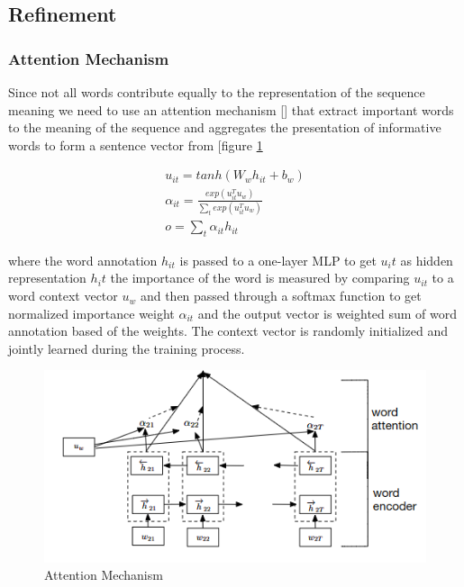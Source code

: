 \documentclass{article}
\begin{document}
    \subsection{Refinement}

    \subsubsection{Attention Mechanism}
    Since not all words contribute equally to the representation of the sequence meaning we need to use an attention mechanism [\cite{yang2016hierarchical}] that extract important words to the meaning of the sequence and aggregates the presentation of informative words to form a sentence vector from [figure \ref{fig:attention}
    
    \begin{align}
        u_{it} = tanh(W_w h_{it} + b_w) \\
        \alpha_{it} = \frac{exp(u_{it}^T u_w)}{\sum_t exp(u_{it}^T u_w)} \\
        o = \sum_t \alpha_{it}h_{it} 
    \end{align}
    
    where the word annotation $h_{it}$ is passed to a one-layer MLP to get $u_it$ as hidden representation $h_it$  the importance of the word is measured by comparing $u_{it}$ to a word context vector $u_w$ and then passed through a softmax function to get normalized importance weight $\alpha_{it}$ and the output vector is weighted sum of word annotation based of the weights. The context vector is randomly initialized and jointly learned during the training process.

    \begin{figure}
        \centering
        \includegraphics[scale=0.7]{attention.png}
        \caption{Attention Mechanism \cite{yang2016hierarchical}}
        \label{fig:attention}
    \end{figure}
\end{document}
